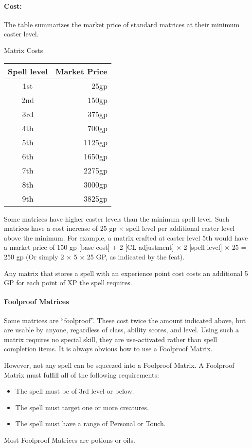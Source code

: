 \paragraph{Cost:} The  table summarizes the market price of standard matrices at their minimum caster level.
\begin{tableonecolumn}
\caption{Matrix Costs}
\label{tab:MatrixCosts}
\begin{tabular}{cr}
\toprule
\textbf{Spell level}&\textbf{Market Price}\\
\midrule
1st&	25gp	\\
2nd&	150gp	\\
3rd&	375gp	\\
4th&	700gp	\\
5th&	1125gp	\\
6th&	1650gp	\\
7th&	2275gp	\\
8th&	3000gp	\\
9th&	3825gp	\\
\bottomrule
\end{tabular}
\end{tableonecolumn}
Some matrices have higher caster levels than the minimum spell level. Such matrices have a cost increase of 25 gp $\times$ spell level per additional caster level above the minimum. For example, a  matrix crafted at caster level 5th would have a market price of 150 gp [base cost] + 2 [CL adjustment] $\times$ 2 [spell level] $\times$ 25 = 250 gp (Or simply 2 $\times$ 5 $\times$ 25 GP, as indicated by the  feat).

Any matrix that stores a spell with an experience point cost costs an additional 5 GP for each point of XP the spell requires.
\paragraph{Foolproof Matrices}
\label{Item:FoolproofMatrices}
Some matrices are ``foolproof''. These cost twice the amount indicated above, but are usable by anyone, regardless of class, ability scores, and level.
Using such a matrix requires no special skill, they are use-activated rather than spell completion items.
It is always obvious how to use a Foolproof Matrix.

However, not any spell can be squeezed into a Foolproof Matrix. A Foolproof Matrix must fulfill all of the following requirements:
\begin{itemize}
 \item The spell must be of 3rd level or below.
 \item The spell must target one or more creatures.
 \item The spell must have a range of Personal or Touch.
\end{itemize}
Most Foolproof Matrices are potions or oils.
